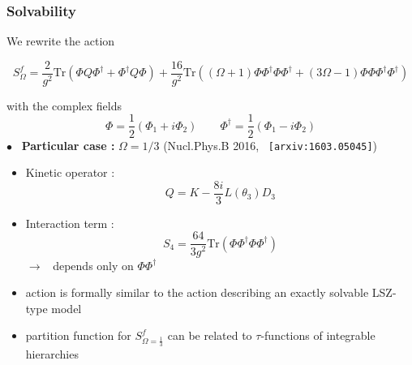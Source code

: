 \documentclass[9pt]{beamer}
\begin{document}

\begin{frame}

\frametitle{Solvability}

We rewrite the action

\begin{equation*}
S^f_\Omega = \frac{2}{g^2} \mbox{Tr}\left( \Phi Q \Phi^\dag + \Phi^\dag Q\Phi \right) + \frac{16}{g^2} \mbox{Tr}\left( (\Omega+1) \Phi\Phi^\dag\Phi\Phi^\dag + (3\Omega-1) \Phi\Phi\Phi^\dag\Phi^\dag \right)
\end{equation*}
 
with the complex fields
%
\begin{equation*}
\Phi=\frac{1}{2}(\Phi_1+i\Phi_2) \qquad \Phi^\dag=\frac{1}{2}(\Phi_1-i\Phi_2)
\end{equation*}
$\bullet$ \ \textbf{Particular case :} $\Omega=1/3$ \quad (Nucl.Phys.B 2016, \ \texttt{[arxiv:1603.05045]})

\begin{itemize}
\item Kinetic operator :
%
\begin{equation*}
Q = K - \frac{8i}{3} L(\theta_3) D_3
\end{equation*}


\item Interaction term : 
%
\begin{equation*}
S_4 = \frac{64}{3g^2} \mbox{Tr}\left( \Phi\Phi^\dag\Phi\Phi^\dag\right)
\end{equation*}
$\to$ \ depends only on $\Phi\Phi^\dag$

\item action is formally similar to the action describing an exactly solvable LSZ-type model

\item partition function for $S^f_{\Omega=\frac{1}{3}}$ can be related to $\tau$-functions of integrable hierarchies

\end{itemize}


\end{frame}




%
\end{document}
